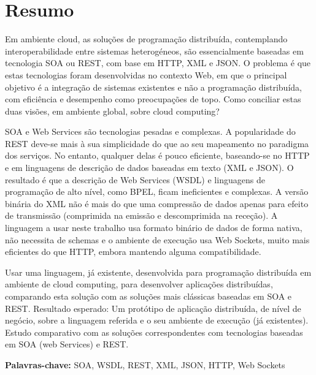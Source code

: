
\section*{Resumo}


Em ambiente cloud, as soluções de programação distribuída, contemplando interoperabilidade entre sistemas heterogéneos,
são essencialmente baseadas em tecnologia SOA ou REST, com base em HTTP, XML e JSON. O problema é que estas tecnologias
foram desenvolvidas no contexto Web, em que o principal objetivo é a integração de sistemas existentes e não a programação
distribuída, com eficiência e desempenho como preocupações de topo. Como conciliar estas duas visões, em ambiente global,
sobre cloud computing?

SOA e Web Services são tecnologias pesadas e complexas. A popularidade do REST deve-se mais à sua simplicidade do que ao seu
mapeamento no paradigma dos serviços. No entanto, qualquer delas é pouco eficiente, baseando-se no HTTP e em linguagens de
descrição de dados baseadas em texto (XML e JSON). O resultado é que a descrição de Web Services (WSDL) e linguagens de
programação de alto nível, como BPEL, ficam ineficientes e complexas. A versão binária do XML não é mais do que uma compressão
de dados apenas para efeito de transmissão (comprimida na emissão e descomprimida na receção). A linguagem a usar neste
trabalho usa formato binário de dados de forma nativa, não necessita de schemas e o ambiente de execução usa Web Sockets,
muito mais eficientes do que HTTP, embora mantendo alguma compatibilidade.

Usar uma linguagem, já existente, desenvolvida para programação distribuída em ambiente de cloud computing, para desenvolver
aplicações distribuídas, comparando esta solução com as soluções mais clássicas baseadas em SOA e REST.
Resultado esperado: Um protótipo de aplicação distribuída, de nível de negócio, sobre a linguagem referida e o seu ambiente
de execução (já existentes). Estudo comparativo com as soluções correspondentes com tecnologias baseadas em SOA (web Services)
e REST.

\vfill

\textbf{\Large Palavras-chave:} SOA, WSDL, REST, XML, JSON, HTTP, Web Sockets
